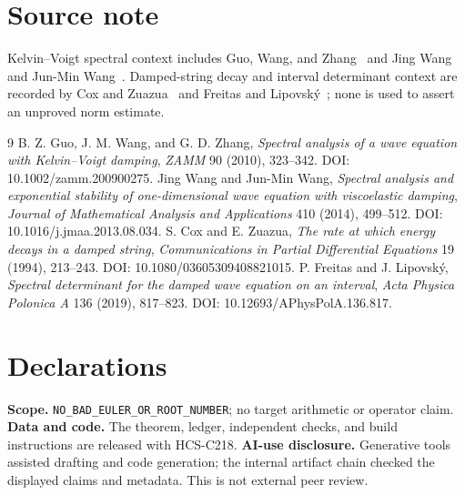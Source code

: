 \documentclass[11pt]{article}
\begin{document}
\section*{Source note}
Kelvin--Voigt spectral context includes Guo, Wang, and Zhang~\cite{gwz2010}
and Jing Wang and Jun-Min Wang~\cite{ww2014}.  Damped-string decay and interval determinant
context are recorded by Cox and Zuazua~\cite{cz1994} and Freitas and
Lipovský~\cite{fl2019}; none is used to assert an unproved norm estimate.
\begin{thebibliography}{9}
 B. Z. Guo, J. M. Wang, and G. D. Zhang, \textit{Spectral analysis of
a wave equation with Kelvin--Voigt damping}, \emph{ZAMM} 90 (2010), 323--342.
DOI: 10.1002/zamm.200900275.
 Jing Wang and Jun-Min Wang, \textit{Spectral analysis and
exponential stability of one-dimensional wave equation with viscoelastic
damping}, \emph{Journal of Mathematical Analysis and Applications} 410 (2014),
499--512. DOI: 10.1016/j.jmaa.2013.08.034.
 S. Cox and E. Zuazua, \textit{The rate at which energy decays
in a damped string}, \emph{Communications in Partial Differential Equations}
19 (1994), 213--243. DOI: 10.1080/03605309408821015.
 P. Freitas and J. Lipovský, \textit{Spectral determinant for
the damped wave equation on an interval}, \emph{Acta Physica Polonica A} 136
(2019), 817--823. DOI: 10.12693/APhysPolA.136.817.
\end{thebibliography}

\section*{Declarations}
\textbf{Scope.} \texttt{NO\_BAD\_EULER\_OR\_ROOT\_NUMBER}; no target arithmetic
or operator claim. \textbf{Data and code.} The theorem, ledger, independent
checks, and build instructions are released with HCS-C218.
\textbf{AI-use disclosure.} Generative tools assisted drafting and code
generation; the internal artifact chain checked the displayed claims and
metadata.  This is not external peer review.
\end{document}
